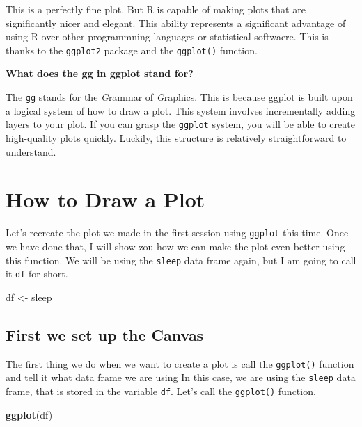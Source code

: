 \documentclass[
]{book}
\newenvironment{Shaded}{\begin{snugshade}}{\end{snugshade}}
\newcommand{\FunctionTok}[1]{\textcolor[rgb]{0.13,0.29,0.53}{\textbf{#1}}}
\newcommand{\NormalTok}[1]{#1}
\newcommand{\OtherTok}[1]{\textcolor[rgb]{0.56,0.35,0.01}{#1}}
\begin{document}
This is a perfectly fine plot. But R is capable of making plots that are significantly nicer and elegant. This ability represents a significant advantage of using R over other programmning languages or statistical softwaere. This is thanks to the \texttt{ggplot2} package and the \texttt{ggplot()} function.

\textbf{What does the gg in ggplot stand for?}

The \texttt{gg} stands for the \emph{G}rammar of \emph{G}raphics. This is because ggplot is built upon a logical system of how to draw a plot. This system involves incrementally adding layers to your plot. If you can grasp the \texttt{ggplot} system, you will be able to create high-quality plots quickly. Luckily, this structure is relatively straightforward to understand.

\hypertarget{how-to-draw-a-plot}{%
\section{How to Draw a Plot}\label{how-to-draw-a-plot}}

Let's recreate the plot we made in the first session using \texttt{ggplot} this time. Once we have done that, I will show zou how we can make the plot even better using this function. We will be using the \texttt{sleep} data frame again, but I am going to call it \texttt{df} for short.

\begin{Shaded}
\begin{Highlighting}[]
\NormalTok{df }\OtherTok{\textless{}{-}}\NormalTok{ sleep }
\end{Highlighting}
\end{Shaded}

\hypertarget{first-we-set-up-the-canvas}{%
\subsection{First we set up the Canvas}\label{first-we-set-up-the-canvas}}

The first thing we do when we want to create a plot is call the \texttt{ggplot()} function and tell it what data frame we are using In this case, we are using the \texttt{sleep} data frame, that is stored in the variable \texttt{df}. Let's call the \texttt{ggplot()} function.

\begin{Shaded}
\begin{Highlighting}[]
\FunctionTok{ggplot}\NormalTok{(df)}
\end{Highlighting}
\end{Shaded}
\end{document}
